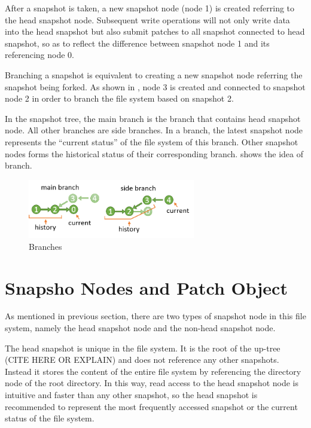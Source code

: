     After a snapshot is taken, a new snapshot node (node 1) is created referring to the head snapshot node. Subsequent write operations will not only write data into the head snapshot but also submit patches to all snapshot connected to head snapshot, so as to reflect the difference between snapshot node 1 and its referencing node 0.

    Branching a snapshot is equivalent to creating a new snapshot node referring the snapshot being forked. As shown in , node 3 is created and connected to snapshot node 2 in order to branch the file system based on snapshot 2.

    In the snapshot tree, the main branch is the branch that contains head snapshot node. All other branches are side branches. In a branch, the latest snapshot node represents the “current status” of the file system of this branch. Other snapshot nodes forms the historical status of their corresponding branch.  shows the idea of branch.

\begin{figure}[hbtp]
\centering
\includegraphics[width=0.65\textwidth]{Chapter-4/figs/fig22.png}
\caption{Branches}
\label{fig:branches}
\end{figure}

\section{Snapsho Nodes and Patch Object}

    As mentioned in previous section, there are two types of snapshot node in this file system, namely the head snapshot node and the non-head snapshot node.

    The head snapshot is unique in the file system. It is the root of the up-tree (CITE HERE OR EXPLAIN) and does not reference any other snapshots. Instead it stores the content of the entire file system by referencing the directory node of the root directory. In this way, read access to the head snapshot node is intuitive and faster than any other snapshot, so the head snapshot is recommended to represent the most frequently accessed snapshot or the current status of the file system.

